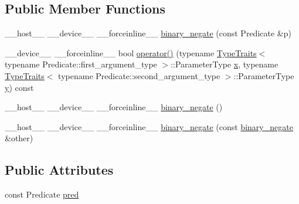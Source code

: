\subsection*{Public Member Functions}
\begin{DoxyCompactItemize}
\item 
\-\_\-\-\_\-host\-\_\-\-\_\- \-\_\-\-\_\-device\-\_\-\-\_\- \-\_\-\-\_\-forceinline\-\_\-\-\_\- \hyperlink{structcv_1_1gpu_1_1device_1_1binary__negate_a5a6b74e40fb08a5f1a11a4899cafd37f}{binary\-\_\-negate} (const Predicate \&p)
\item 
\-\_\-\-\_\-device\-\_\-\-\_\- \-\_\-\-\_\-forceinline\-\_\-\-\_\- bool \hyperlink{structcv_1_1gpu_1_1device_1_1binary__negate_a96b939cd60b2c6503cdf1c7295ea3403}{operator()} (typename \hyperlink{structcv_1_1gpu_1_1device_1_1TypeTraits}{Type\-Traits}$<$ typename Predicate\-::first\-\_\-argument\-\_\-type $>$\-::Parameter\-Type \hyperlink{highgui__c_8h_a6150e0515f7202e2fb518f7206ed97dc}{x}, typename \hyperlink{structcv_1_1gpu_1_1device_1_1TypeTraits}{Type\-Traits}$<$ typename Predicate\-::second\-\_\-argument\-\_\-type $>$\-::Parameter\-Type \hyperlink{highgui__c_8h_af1202c02b14870c18fb3a1da73e9e7c7}{y}) const 
\item 
\-\_\-\-\_\-host\-\_\-\-\_\- \-\_\-\-\_\-device\-\_\-\-\_\- \-\_\-\-\_\-forceinline\-\_\-\-\_\- \hyperlink{structcv_1_1gpu_1_1device_1_1binary__negate_a9f975ab2b68f8001a18d090c54fead11}{binary\-\_\-negate} ()
\item 
\-\_\-\-\_\-host\-\_\-\-\_\- \-\_\-\-\_\-device\-\_\-\-\_\- \-\_\-\-\_\-forceinline\-\_\-\-\_\- \hyperlink{structcv_1_1gpu_1_1device_1_1binary__negate_a3c85973cd2fe897f432df018311c08e0}{binary\-\_\-negate} (const \hyperlink{structcv_1_1gpu_1_1device_1_1binary__negate}{binary\-\_\-negate} \&other)
\end{DoxyCompactItemize}
\subsection*{Public Attributes}
\begin{DoxyCompactItemize}
\item 
const Predicate \hyperlink{structcv_1_1gpu_1_1device_1_1binary__negate_abda3894cd4ecc6fe0f490fb7b9fc4cd3}{pred}
\end{DoxyCompactItemize}


